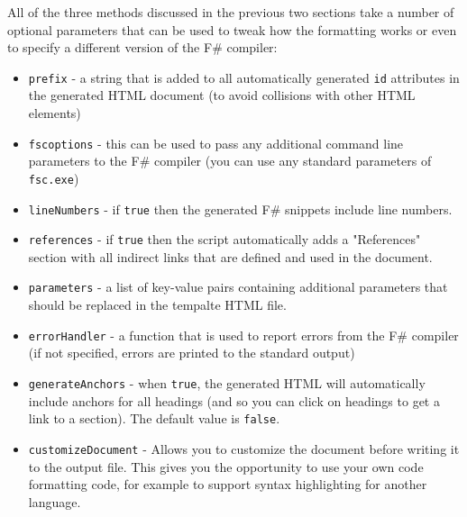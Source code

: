 \documentclass{article}
\begin{document}
All of the three methods discussed in the previous two sections take a number of optional
parameters that can be used to tweak how the formatting works or even to specify a different
version of the F\# compiler:
\begin{itemize}
\item \texttt{prefix} - a string that is added to all automatically generated \texttt{id} attributes
in the generated HTML document (to avoid collisions with other HTML elements)

\item \texttt{fscoptions} - this can be used to pass any additional command line 
parameters to the F\# compiler (you can use any standard parameters of \texttt{fsc.exe})

\item \texttt{lineNumbers} - if \texttt{true} then the generated F\# snippets include line numbers.

\item \texttt{references} - if \texttt{true} then the script automatically adds a "References" 
section with all indirect links that are defined and used in the document.

\item \texttt{parameters} - a list of key-value pairs containing additional parameters
that should be replaced in the tempalte HTML file.

\item \texttt{errorHandler} - a function that is used to report errors from the F\# compiler 
(if not specified, errors are printed to the standard output)

\item \texttt{generateAnchors} - when \texttt{true}, the generated HTML will automatically include
anchors for all headings (and so you can click on headings to get a link
to a section). The default value is \texttt{false}.

\item \texttt{customizeDocument} - Allows you to customize the document before writing it 
to the output file. This gives you the opportunity to use your own
code formatting code, for example to support syntax highlighting for another language.

\end{itemize}
\end{document}

